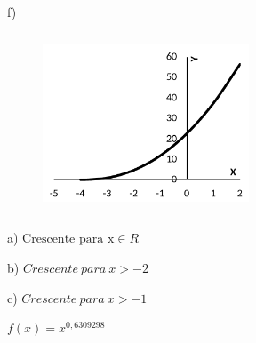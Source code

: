 \begin{respostas}{2}
~~

f)

	\begin{figure}[H]
		\begin{Center}
			\includegraphics[width=2.42in,height=2.11in]{capitulos/outras_funcoes/media/image39.pdf}
		\end{Center}
	\end{figure}


	\setcounter{enumi}{4}
	\ansitem{} a) \( \text{Crescente para x}  \in R  \)

	b) \( Crescente~para~x>-2 \) \quad 

	c)  \( Crescente~para~x>-1 \) 

	\ansitem{} \( f \left( x \right) =x^{0,6309298} \)  

\end{respostas}

